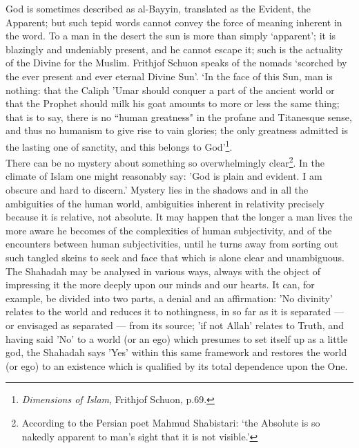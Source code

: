 \documentclass[10pt, twoside]{book}
\begin{document}
God is sometimes described as al\hyp{}Bayyin, translated as the Evident, the Apparent; but such tepid 
words cannot convey the force of meaning inherent in the word. To a man in the desert the sun is more 
than simply `apparent'; it is blazingly and undeniably present, and he cannot escape it; such is the 
actuality of the Divine for the Muslim. Frithjof Schuon speaks of the nomads `scorched by the ever 
present and ever eternal Divine Sun'. `In the face of this Sun, man is nothing: that the Caliph 'Umar 
should conquer a part of the ancient world or that the Prophet should milk his goat amounts to more 
or less the same thing; that is to say, there is no ``human greatness" in the profane and Titanesque 
sense, and thus no humanism to give rise to vain glories; the only greatness admitted is the lasting 
one of sanctity, and this belongs to God'\footnote{\emph{Dimensions of Islam}, Frithjof Schuon, p.69.}. \\

There can be no mystery about something so overwhelmingly clear\footnote{According to the Persian poet Mahmud Shabistari: `the Absolute is so nakedly apparent to man's sight that it is not visible.'}. In the climate of Islam one might reasonably say: 'God is plain and evident. I am obscure and hard to discern.' Mystery lies in the shadows and in all the ambiguities of the human world, ambiguities inherent in relativity precisely because it is relative, not absolute. It may happen that the longer a man lives the more aware he 
becomes of the complexities of human subjectivity, and of the encounters between human 
subjectivities, until he turns away from sorting out such tangled skeins to seek and face that which 
is alone clear and unambiguous. \\

The Shahadah may be analysed in various ways, always with the object of impressing it the more deeply 
upon our minds and our hearts. It can, for example, be divided into two parts, a denial and an 
affirmation: 'No divinity' relates to the world and reduces it to nothingness, in so far as it is 
separated --- or envisaged as separated --- from its source; 'if not Allah' relates to Truth, and having 
said 'No' to a world (or an ego) which presumes to set itself up as a little god, the Shahadah says 
'Yes' within this same framework and restores the world (or ego) to an existence which is qualified 
by its total dependence upon the One. \\
\end{document}
